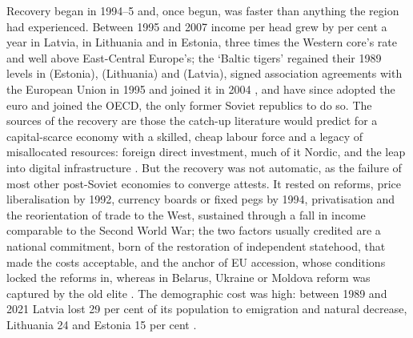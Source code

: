 

Recovery began in 1994--5 \parencite[12--13]{kukk_2014_road} and, once begun, was faster than anything the region had experienced. Between 1995 and 2007 income per head grew by  per cent a year in Latvia,  in Lithuania and  in Estonia, three times the Western core's rate and well above East-Central Europe's; the `Baltic tigers' regained their 1989 levels in \eeREGAINeightynine{} (Estonia), \ltREGAINeightynine{} (Lithuania) and \lvREGAINeightynine{} (Latvia), signed association agreements with the European Union in 1995 and joined it in 2004 \parencite[138, 157, 163, 188]{jeffries_2004_countries}, and have since adopted the euro and joined the OECD, the only former Soviet republics to do so. The sources of the recovery are those the catch-up literature would predict for a capital-scarce economy with a skilled, cheap labour force and a legacy of misallocated resources: foreign direct investment, much of it Nordic, and the leap into digital infrastructure \parencites[123--37]{Berend_from_soviet_bloc}[452, 454]{transition_progress}. But the recovery was not automatic, as the failure of most other post-Soviet economies to converge attests. It rested on reforms, price liberalisation by 1992, currency boards or fixed pegs by 1994, privatisation and the reorientation of trade to the West, sustained through a fall in income comparable to the Second World War; the two factors usually credited are a national commitment, born of the restoration of independent statehood, that made the costs acceptable, and the anchor of EU accession, whose conditions locked the reforms in, whereas in Belarus, Ukraine or Moldova reform was captured by the old elite \parencites[267, 318]{how_capitalism_aslund}[458, 461]{transition_progress}. The demographic cost was high: between 1989 and 2021 Latvia lost 29 per cent of its population to emigration and natural decrease, Lithuania 24 and Estonia 15 per cent \parencites[42]{klimantas2025thesis}[66]{hazans_2013_emigration}[213]{mezs_2024_latvijas}.

